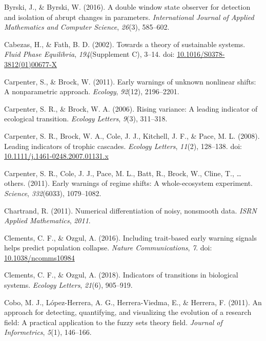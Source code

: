 \documentclass[12pt,twoside,openany]{reedthesis}
\begin{document}
\leavevmode\hypertarget{ref-byrski2016double}{}%
Byrski, J., \& Byrski, W. (2016). A double window state observer for detection and isolation of abrupt changes in parameters. \emph{International Journal of Applied Mathematics and Computer Science}, \emph{26}(3), 585--602.

\leavevmode\hypertarget{ref-cabezas_towards_2002}{}%
Cabezas, H., \& Fath, B. D. (2002). Towards a theory of sustainable systems. \emph{Fluid Phase Equilibria}, \emph{194}(Supplement C), 3--14. doi: \href{https://doi.org/10.1016/S0378-3812(01)00677-X}{10.1016/S0378-3812(01)00677-X}

\leavevmode\hypertarget{ref-carpenterBrock2011early}{}%
Carpenter, S., \& Brock, W. (2011). Early warnings of unknown nonlinear shifts: A nonparametric approach. \emph{Ecology}, \emph{92}(12), 2196--2201.

\leavevmode\hypertarget{ref-carpenter2006rising}{}%
Carpenter, S. R., \& Brock, W. A. (2006). Rising variance: A leading indicator of ecological transition. \emph{Ecology Letters}, \emph{9}(3), 311--318.

\leavevmode\hypertarget{ref-carpenter_leading_2008}{}%
Carpenter, S. R., Brock, W. A., Cole, J. J., Kitchell, J. F., \& Pace, M. L. (2008). Leading indicators of trophic cascades. \emph{Ecology Letters}, \emph{11}(2), 128--138. doi: \href{https://doi.org/10.1111/j.1461-0248.2007.01131.x}{10.1111/j.1461-0248.2007.01131.x}

\leavevmode\hypertarget{ref-carpenter2011early}{}%
Carpenter, S. R., Cole, J. J., Pace, M. L., Batt, R., Brock, W., Cline, T., \ldots{} others. (2011). Early warnings of regime shifts: A whole-ecosystem experiment. \emph{Science}, \emph{332}(6033), 1079--1082.

\leavevmode\hypertarget{ref-chartrand2011numerical}{}%
Chartrand, R. (2011). Numerical differentiation of noisy, nonsmooth data. \emph{ISRN Applied Mathematics}, \emph{2011}.

\leavevmode\hypertarget{ref-clements_including_2016}{}%
Clements, C. F., \& Ozgul, A. (2016). Including trait-based early warning signals helps predict population collapse. \emph{Nature Communications}, \emph{7}. doi: \href{https://doi.org/10.1038/ncomms10984}{10.1038/ncomms10984}

\leavevmode\hypertarget{ref-clements2018indicators}{}%
Clements, C. F., \& Ozgul, A. (2018). Indicators of transitions in biological systems. \emph{Ecology Letters}, \emph{21}(6), 905--919.

\leavevmode\hypertarget{ref-cobo2011approach}{}%
Cobo, M. J., López-Herrera, A. G., Herrera-Viedma, E., \& Herrera, F. (2011). An approach for detecting, quantifying, and visualizing the evolution of a research field: A practical application to the fuzzy sets theory field. \emph{Journal of Informetrics}, \emph{5}(1), 146--166.
\end{document}
